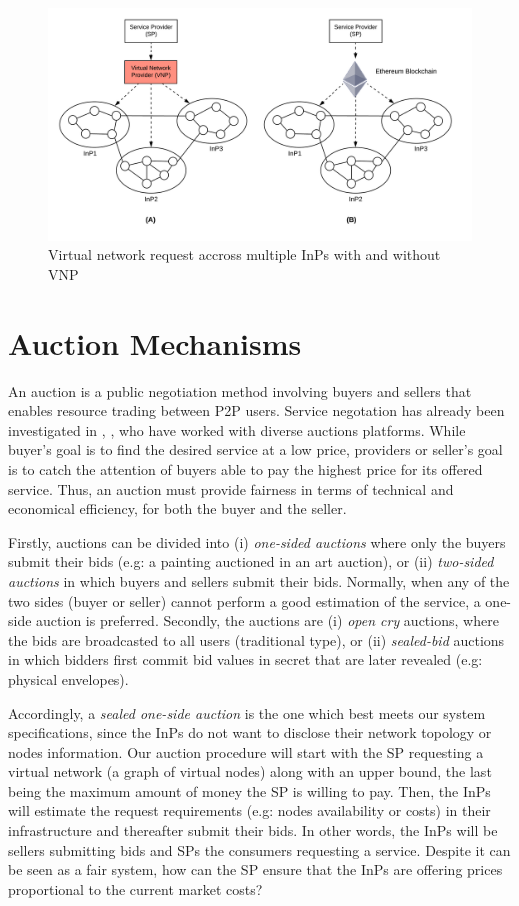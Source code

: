 \begin{figure}
  \centering
  	\includegraphics[scale=0.7]{gfx/multiprov.png}
  \caption{Virtual network request accross multiple InPs with and without VNP}
  \label{fig:multiprov}
\end{figure}

\section{Auction Mechanisms}

An auction is a public negotiation method involving buyers and sellers that enables resource trading between P2P users. Service negotation has already been investigated in \citep{hausheer2005peermart}, \cite{ogston2002peer}, who have worked with diverse auctions platforms. While buyer's goal is to find the desired service at a low price, providers or seller's goal is to catch the attention of buyers able to pay the highest price for its offered service. Thus, an auction must provide fairness in terms of technical and economical efficiency, for both the buyer and the seller.

Firstly, auctions can be divided into (i) \textit{one-sided auctions} where only the buyers submit their bids (e.g: a painting auctioned in an art auction), or (ii) \textit{two-sided auctions} in which buyers and sellers submit their bids. Normally, when any of the two sides (buyer or seller) cannot perform a good estimation of the service, a one-side auction is preferred. Secondly, the auctions are (i) \textit{open cry} auctions, where the bids are broadcasted to all users (traditional type), or (ii) \textit{sealed-bid} auctions in which bidders first commit bid values in secret that are later revealed (e.g: physical envelopes).

Accordingly, a \textit{sealed one-side auction} is the one which best meets our system specifications, since the InPs do not want to disclose their network topology or nodes information. Our auction procedure will start with the SP requesting a virtual network (a graph of virtual nodes) along with an upper bound, the last being the maximum amount of money the SP is willing to pay. Then, the InPs will estimate the request requirements (e.g: nodes availability or costs) in their infrastructure and thereafter submit their bids. In other words, the InPs will be sellers submitting bids and SPs the consumers requesting a service. Despite it can be seen as a fair system, how can the SP ensure that the InPs are offering prices proportional to the current market costs?

